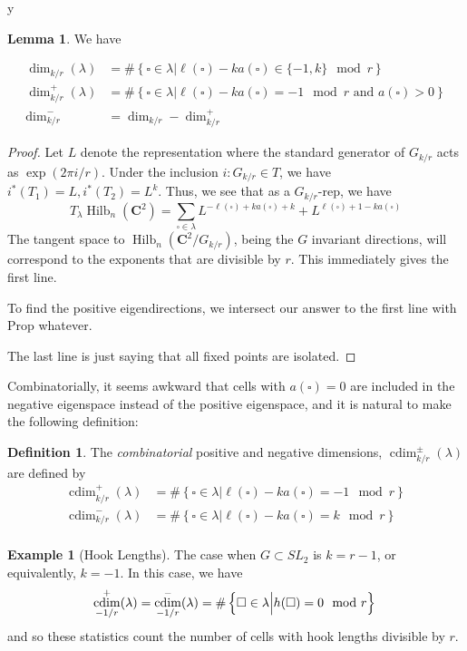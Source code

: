 y\documentclass{amsart}[12pt]
\theoremstyle{definition}
\newtheorem{lemma}[dummy]{Lemma}
\newtheorem{example}[dummy]{Example}
\newtheorem{definition}[dummy]{Definition}
\newcommand{\C}{\mathbf{C}}
\DeclareMathOperator{\Hilb}{Hilb}
\DeclareMathOperator{\cdim}{cdim}
\begin{document}
\begin{lemma} We have

\begin{align*}
\dim_{k/r}(\lambda)&=\#\left\{\square\in\lambda \Big | \ell(\square)-k a(\square)\in\{-1,k\} \mod r\right\} \\
\dim^+_{k/r}(\lambda)& =\#\left\{\square\in\lambda \Big | \ell(\square)-k a(\square)=-1 \mod r \text{ and } a(\square)>0\right\} \\
\dim^-_{k/r} &= \dim_{k/r}-\dim^+_{k/r}
\end{align*}
\end{lemma}
\begin{proof}
Let $L$ denote the representation where the standard generator of $G_{k/r}$ acts as $\exp(2\pi i/r)$. Under the inclusion $i:G_{k/r}\in T$, we have $i^*(T_1)=L, i^*(T_2)=L^k$.  Thus, we see that as a $G_{k/r}$-rep, we have
$$T_\lambda \Hilb_n(\C^2)=\sum_{\square\in\lambda} L^{-\ell(\square)+ka(\square)+k}+L^{\ell(\square)+1-ka(\square)}$$
The tangent space to $\Hilb_n(\C^2/G_{k/r})$, being the $G$ invariant directions, will correspond to the exponents that are divisible by $r$.  This immediately gives the first line.

To find the positive eigendirections, we intersect our answer to the first line with Prop whatever.

The last line is just saying that all fixed points are isolated.
\end{proof}

Combinatorially, it seems awkward that cells with $a(\square)=0$ are included in the negative eigenspace instead of the positive eigenspace, and it is natural to make the following definition:
\begin{definition}
The \emph{combinatorial} positive and negative dimensions, $\cdim^\pm_{k/r}(\lambda)$ are defined by
\begin{align*}
\cdim^+_{k/r}(\lambda)&=\#\left\{\square\in\lambda \Big | \ell(\square)-k a(\square)=-1 \mod r\right\} \\
\cdim^-_{k/r}(\lambda)&=\#\left\{\square\in\lambda \Big | \ell(\square)-k a(\square)=k \mod r\right\} \\
\end{align*}
\end{definition}

\begin{example}[Hook Lengths]
The case when $G\subset SL_2$ is $k=r-1$, or equivalently, $k=-1$.  In this case, we have
$$\cdim^+_{-1/r}(\lambda)=\cdim^-_{-1/r}(\lambda)=\#\left\{\square\in\lambda \Big | h(\square)=0\mod r\right\} \\$$
and so these statistics count the number of cells with hook lengths divisible by $r$.
\end{example}
\end{document}
